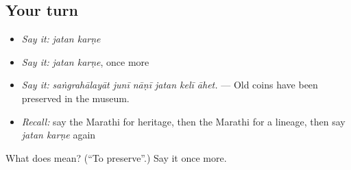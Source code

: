 \subsection*{Your turn}
\begin{itemize}
\raggedright
  \item \emph{Say it:} \emph{jatan karṇe}
  \item \emph{Say it:} \emph{jatan karṇe}, once more
  \item \emph{Say it:} \emph{saṅgrahālayāt junī nāṇī jatan kelī āhet.} — Old coins have been preserved in the museum.
  \item \emph{Recall:} say the Marathi for heritage, then the Marathi for a lineage, then say \emph{jatan karṇe} again
\end{itemize}

\begin{tcolorbox}[breakable,colback=teal!4,colframe=teal!35!black,title={Before you move on}]
What does   mean? (\textquotedblleft{}To preserve\textquotedblright{}.) Say it once more.
\end{tcolorbox}
